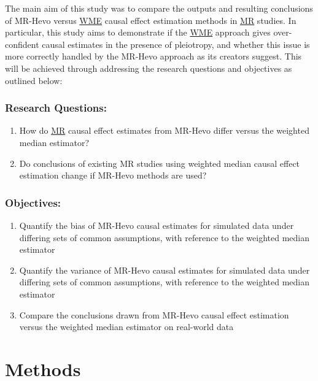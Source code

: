 \documentclass[
]{article}
\providecommand{\tightlist}{%
  \setlength{\itemsep}{0pt}\setlength{\parskip}{0pt}}
\begin{document}
The main aim of this study was to compare the outputs and resulting conclusions of MR-Hevo versus \hyperref[acronyms_WME]{WME} causal effect estimation methods in \hyperref[acronyms_MR]{MR} studies. In particular, this study aims to demonstrate if the \hyperref[acronyms_WME]{WME} approach gives over-confident causal estimates in the presence of pleiotropy, and whether this issue is more correctly handled by the MR-Hevo approach as its creators suggest. This will be achieved through addressing the research questions and objectives as outlined below:

\subsubsection*{Research Questions:}\label{research-questions}

\begin{enumerate}
\def\labelenumi{\arabic{enumi}.}
\tightlist
\item
  How do \hyperref[acronyms_MR]{MR} causal effect estimates from MR-Hevo differ versus the weighted median estimator?
\item
  Do conclusions of existing MR studies using weighted median causal effect estimation change if MR-Hevo methods are used?
\end{enumerate}

\subsubsection*{Objectives:}\label{objectives}

\begin{enumerate}
\def\labelenumi{\arabic{enumi}.}
\tightlist
\item
  Quantify the bias of MR-Hevo causal estimates for simulated data under differing sets of common assumptions, with reference to the weighted median estimator
\item
  Quantify the variance of MR-Hevo causal estimates for simulated data under differing sets of common assumptions, with reference to the weighted median estimator
\item
  Compare the conclusions drawn from MR-Hevo causal effect estimation versus the weighted median estimator on real-world data
\end{enumerate}

\newpage

\section{Methods}\label{Methods}
\end{document}
